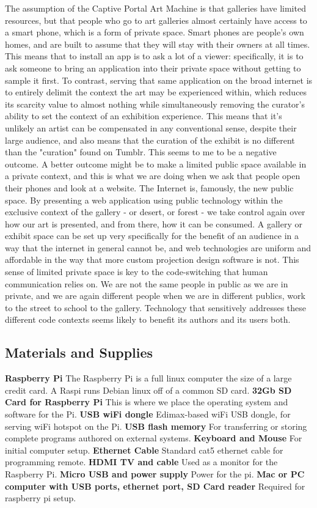 The assumption of the Captive Portal Art Machine is that galleries have limited resources, but that people who go to art galleries almost certainly have access to a smart phone, which is a form of private space. Smart phones are people's own homes, and are built to assume that they will stay with their owners at all times. This means that to install an app is to ask a lot of a viewer: specifically, it is to ask someone to bring an application into their private space without getting to sample it first. To contrast, serving that same application on the broad internet is to entirely delimit the context the art may be experienced within, which reduces its scarcity value to almost nothing while simultaneously removing the curator's ability to set the context of an exhibition experience. This means that it's unlikely an artist can be compensated in any conventional sense, despite their large audience, and also means that the curation of the exhibit is no different than the "curation" found on Tumblr. This seems to me to be a negative outcome.
A better outcome might be to make a limited public space available in a private context, and this is what we are doing when we ask that people open their phones and look at a website. The Internet is, famously, the new public space. By presenting a web application using public technology within the exclusive context of the gallery - or desert, or forest - we take control again over how our art is presented, and from there, how it can be consumed. A gallery or exhibit space can be set up very specifically for the benefit of an audience in a way that the internet in general cannot be, and web technologies are uniform and affordable in the way that more custom projection design software is not.
This sense of limited private space is key to the code-switching that human communication relies on. We are not the same people in public as we are in private, and we are again different people when we are in different publics, work to the street to school to the gallery. Technology that sensitively addresses these different code contexts seems likely to benefit its authors and its users both.
 
 \subsection{Materials and Supplies}
\textbf{Raspberry Pi}
The Raspberry Pi is a full linux computer the size of a large credit card. A Raspi runs Debian linux off of a common SD card.
\textbf{32Gb SD Card for Raspberry Pi}
This is where we place the operating system and software for the Pi.
\textbf{USB wiFi dongle}
Edimax-based wiFi USB dongle, for serving wiFi hotspot on the Pi.
\textbf{USB flash memory}
For transferring or storing complete programs authored on external systems.
\textbf{Keyboard and Mouse}
For initial computer setup.
\textbf{Ethernet Cable}
Standard cat5 ethernet cable for programming remote.
\textbf{HDMI TV and cable}
Used as a monitor for the Raspberry Pi.
\textbf{Micro USB and power supply}
Power for the pi.
\textbf{Mac or PC computer with USB ports, ethernet port, SD Card reader}
Required for raspberry pi setup.

